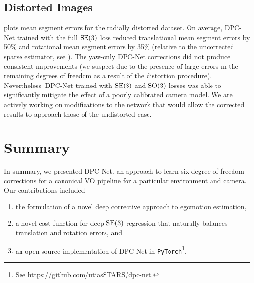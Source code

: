 \subsection{Distorted Images}

 plots mean segment errors for the radially distorted dataset. On average, DPC-Net trained with the full $\mathrm{SE}(3)$ loss reduced translational mean segment errors by 50\% and rotational mean segment errors by 35\% (relative to the uncorrected sparse estimator, see ). The yaw-only DPC-Net corrections did not produce consistent improvements (we suspect due to the presence of large errors in the remaining degrees of freedom as a result of the distortion procedure). Nevertheless, DPC-Net trained with $\mathrm{SE}(3)$ and $\mathrm{SO}(3)$ losses was able to significantly mitigate the effect of a poorly calibrated camera model. We are actively working on modifications to the network that would allow the corrected results to approach those of the undistorted case.



\section{Summary}

In summary, we presented DPC-Net, an approach to learn six degree-of-freedom corrections for a canonical VO pipeline for a particular environment and camera. Our contributions included

\begin{enumerate}
	\item the formulation of a novel deep corrective approach to egomotion estimation,
	\item a novel cost function for deep $\mathrm{SE}(3)$ regression that naturally balances translation and rotation errors, and
	\item an open-source implementation of DPC-Net in \texttt{PyTorch}\footnote{See \url{https://github.com/utiasSTARS/dpc-net}.}.
\end{enumerate}


